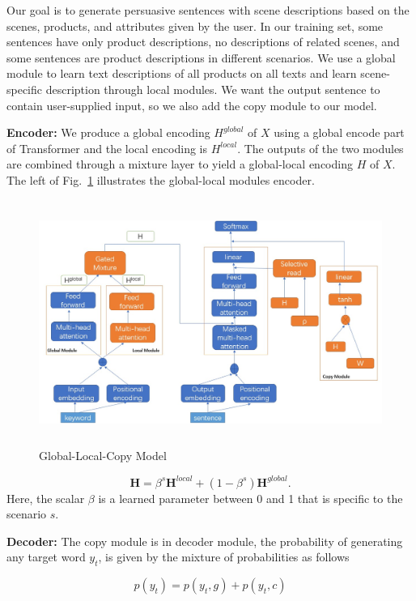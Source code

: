 \documentclass[sigconf]{acmart}
\begin{document}
Our goal is to generate persuasive sentences with scene descriptions based on the scenes, products, and attributes given by the user. In our training set, some sentences have only product descriptions, no descriptions of related scenes, and some sentences are product descriptions in different scenarios. We use a global module to learn text descriptions of all products on all texts and learn scene-specific description through local modules. We want the output sentence to contain user-supplied input, so we also add the copy module to our model.

\textbf{Encoder:} We produce a global encoding $H^{global}$ of $X$ using a global encode part of Transformer and the local encoding is $H^{local}$. The outputs of the two modules are combined through a mixture layer to yield a global-local encoding $H$ of $X$. The left of Fig.~\ref{fig:model} illustrates the global-local modules encoder. 
\begin{figure}
    \centering
    \includegraphics[width=12cm,height=8cm]{model2.jpg}
\caption{Global-Local-Copy Model}\label{fig:model}
\end{figure}

\begin{equation}\label{equ:mixture}
    \mathbf{H} = \beta^s\mathbf{H}^{local} + (1-\beta^s)\mathbf{H}^{global}.
\end{equation}
Here, the scalar $\beta$ is a learned parameter between 0 and 1 that is specific to the scenario $s$.

\textbf{Decoder:} The copy module is in decoder module, the probability of generating any target word $y_t$, is given by the mixture of probabilities as follows

\begin{equation}\label{equ:mixture-prob}
    p(y_t) = p(y_t,g) + p(y_t,c)
\end{equation}
\end{document}
